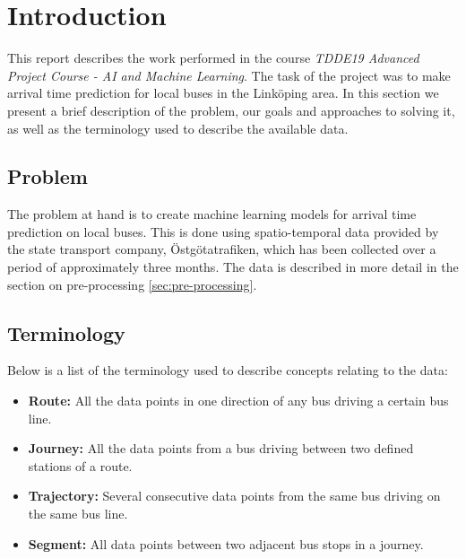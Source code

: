 


\chapter{Introduction}
\label{cha:introduction}
This report describes the work performed in the course \textit{TDDE19 Advanced Project Course - AI and Machine Learning}. The task of the project was to make arrival time prediction for local buses in the Link\"oping area. In this section we present a brief description of the problem, our goals and approaches to solving it, as well as the terminology used to describe the available data.

\section{Problem}
\label{sec:problem}
The problem at hand is to create machine learning models for arrival time prediction on local buses. This is done using spatio-temporal data provided by the state transport company, \"Ostg\"otatrafiken, which has been collected over a period of approximately three months. The data is described in more detail in the section on pre-processing \ref{sec:pre-processing}.

\section{Terminology}
\label{sec:terminology}
Below is a list of the terminology used to describe concepts relating to the data:
\begin{itemize}
\item \textbf{Route:} All the data points in one direction of any bus driving a certain bus line.
\item \textbf{Journey:} All the data points from a bus driving between two defined stations of a route.
\item \textbf{Trajectory:} Several consecutive data points from the same bus driving on the same bus line.
\item \textbf{Segment:} All data points between two adjacent bus stops in a journey.
\\
\end{itemize}

